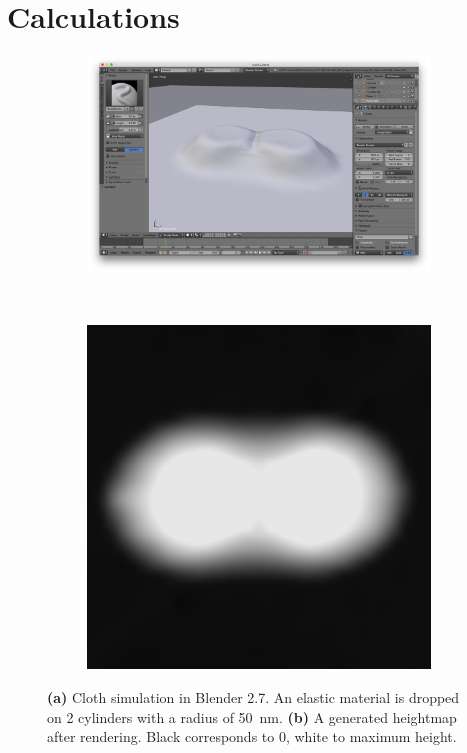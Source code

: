 \newpage
\section{Calculations}

\begin{figure}[!h]
  \centering
  \begin{subfigure}{0.6\textwidth}
    \includegraphics[width=\textwidth]{./images/blender.png}
  \end{subfigure}
  ~
  \begin{subfigure}{0.35\textwidth}
    \includegraphics[width=\textwidth]{./images/map.png}
  \end{subfigure}
  \caption{\textbf{(a)} Cloth simulation in Blender 2.7. An elastic material is dropped on 2 cylinders with a radius of \SI{50}{nm}. \textbf{(b)} A generated heightmap after rendering. Black corresponds to 0, white to maximum height.}
\end{figure}



